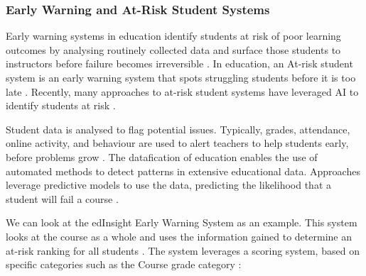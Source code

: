 \subsubsection{Early Warning and At-Risk Student Systems}

Early warning systems in education identify students at risk of poor learning outcomes by analysing routinely collected data and surface those students to instructors before failure becomes irreversible \cite{macfadyenMiningLMSData2010}.
In education, an At-risk student system is an early warning system that spots struggling students before it is too late \cite{baeres_2020_an}. 
Recently, many approaches to at-risk student systems have leveraged AI to identify students at risk \cite{baeres_2020_an}.


Student data is analysed to flag potential issues. Typically, grades, attendance, online activity, and behaviour are used to alert teachers to help students early, before problems grow \cite{baeres_2020_an}. The datafication of education enables the use of automated methods to detect patterns in extensive educational data. Approaches leverage predictive models to use the data, predicting the likelihood that a student will fail a course \cite{baeres_2020_an}.

We can look at the edInsight Early Warning System as an example. This system looks at the course as a whole and uses the information gained to determine an at-risk ranking for all students \cite{a2020_atrisk}. The system leverages a scoring system, based on specific categories such as the Course grade category \cite{a2020_atrisk}:

